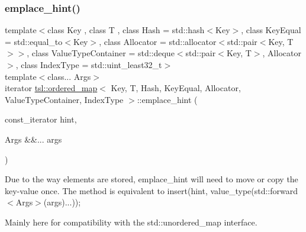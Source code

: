 \subsubsection{\texorpdfstring{emplace\_hint()}{emplace\_hint()}}
{\footnotesize\ttfamily template$<$class Key , class T , class Hash  = std\+::hash$<$\+Key$>$, class Key\+Equal  = std\+::equal\+\_\+to$<$\+Key$>$, class Allocator  = std\+::allocator$<$std\+::pair$<$\+Key, T$>$$>$, class Value\+Type\+Container  = std\+::deque$<$std\+::pair$<$\+Key, T$>$, Allocator$>$, class Index\+Type  = std\+::uint\+\_\+least32\+\_\+t$>$ \\
template$<$class... Args$>$ \\
iterator \mbox{\hyperlink{classtsl_1_1ordered__map}{tsl\+::ordered\+\_\+map}}$<$ Key, T, Hash, Key\+Equal, Allocator, Value\+Type\+Container, Index\+Type $>$\+::emplace\+\_\+hint (\begin{DoxyParamCaption}\item[{const\+\_\+iterator}]{hint,  }\item[{Args \&\&...}]{args }\end{DoxyParamCaption})\hspace{0.3cm}{\ttfamily [inline]}}

Due to the way elements are stored, emplace\+\_\+hint will need to move or copy the key-\/value once. The method is equivalent to insert(hint, value\+\_\+type(std\+::forward$<$\+Args$>$(args)...));

Mainly here for compatibility with the std\+::unordered\+\_\+map interface. \mbox{\label{classtsl_1_1ordered__map_afcf5604ae7a129818d0da106492d0593}} 
